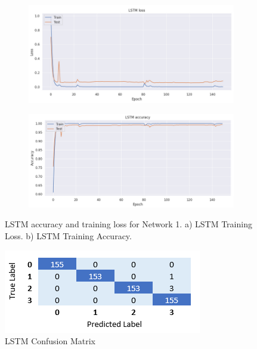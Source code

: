 \documentclass[journal]{IEEEtran}
\begin{document}
	\begin{figure}[t]
		\centering
		\begin{subfigure}[b]{0.92\linewidth}
			\centering
			\includegraphics[width=0.92\linewidth]{LSTM_train_loss}
			\caption{}
			\label{fig:lstm_loss}
		\end{subfigure}
		\begin{subfigure}[b]{0.92\linewidth}
			\centering
			\includegraphics[width=0.92\linewidth]{LSTM_train_accuracy}
			\caption{}
			\label{fig:lstm_acc}
		\end{subfigure}
		\caption{LSTM accuracy and training loss for Network 1. a) LSTM Training Loss. b) LSTM Training Accuracy.}
		\label{fig:lstm_a_l}
	\end{figure}
	
	
	
	\begin{figure}[!t]
		\centering
		\includegraphics[width=0.88\linewidth]{LSTM_confusion_matrix}
		\caption{LSTM Confusion Matrix}
		\label{fig:lstm_cm}
	\end{figure}
	
\end{document}
